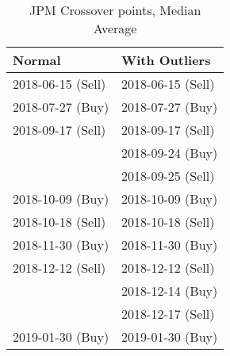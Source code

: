 \begin{table}[!htb]
    \centering
    \begin{tabular}{l|l}
    Normal            & With Outliers     \\ \hline
    2018-06-15 (Sell) & 2018-06-15 (Sell) \\
    2018-07-27 (Buy)  & 2018-07-27 (Buy)  \\
    2018-09-17 (Sell) & 2018-09-17 (Sell) \\
                      & 2018-09-24 (Buy)  \\
                      & 2018-09-25 (Sell)  \\
    2018-10-09 (Buy)  & 2018-10-09 (Buy)  \\
    2018-10-18 (Sell) & 2018-10-18 (Sell)  \\
    2018-11-30 (Buy)  & 2018-11-30 (Buy)  \\
    2018-12-12 (Sell) & 2018-12-12 (Sell) \\
                      & 2018-12-14 (Buy) \\
                      & 2018-12-17 (Sell) \\
    2019-01-30 (Buy)  & 2019-01-30 (Buy)
    \end{tabular}
    \caption{JPM Crossover points, Median Average}
    \label{table:part_4:jpm_cp_med}
\end{table}